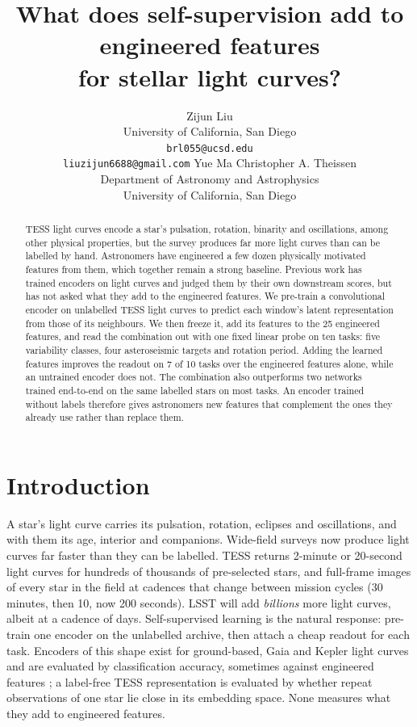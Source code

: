 \documentclass{article}
\title{What does self-supervision add to engineered features\\for stellar light curves?}
\author{%
  Zijun Liu\\
  University of California, San Diego\\
  \texttt{brl055@ucsd.edu}\\
  \texttt{liuzijun6688@gmail.com}
  \And
  Yue Ma
  \And
  Christopher A. Theissen\\
  Department of Astronomy and Astrophysics\\
  University of California, San Diego
}
\begin{document}
\maketitle

\begin{abstract}
TESS light curves encode a star's pulsation, rotation, binarity and oscillations, among other physical
properties, but the survey
produces far more light curves than can be labelled by hand. Astronomers have engineered a few
dozen physically motivated features from them, which together remain a strong baseline. Previous work has trained
encoders on light curves and judged them by their own downstream scores, but has not asked what
they add to the engineered features. We pre-train a convolutional encoder on unlabelled TESS light curves to predict each
window's latent representation from those of its neighbours. We then freeze it, add its features to
the 25 engineered features, and read the combination out with one fixed linear probe on ten tasks:
five variability classes, four asteroseismic targets and rotation period. Adding the learned features
improves the readout on 7 of 10 tasks over the engineered features alone, while an untrained encoder
does not. The combination also outperforms two networks trained end-to-end on the same labelled
stars on most tasks. An encoder trained without labels therefore gives astronomers new features
that complement the ones they already use rather than replace them.
\end{abstract}

\section{Introduction}

A star's light curve carries its pulsation, rotation, eclipses and oscillations, and with them its
age, interior and companions. Wide-field surveys now produce light curves far faster
than they can be labelled. TESS
\citep{ricker2015} returns 2-minute or 20-second \citep{huber2022} light curves for hundreds of
thousands of pre-selected stars, and full-frame images of every star in the field at cadences that
change between mission cycles (30 minutes, then 10, now 200 seconds). LSST \citep{ivezic2019}
will add \emph{billions} more light curves, albeit at a cadence of days. Self-supervised learning is the
natural response: pre-train one encoder on the unlabelled archive, then attach a cheap readout for
each task. Encoders of this shape exist for ground-based, Gaia and Kepler light curves
\citep{donoso2025astromer2,zuo2025falco,rui2026jepa} and are evaluated by classification accuracy,
sometimes against engineered features \citep{rui2026jepa}; a label-free TESS representation
\citep{poznanski2026} is evaluated by whether repeat observations of one star lie close in its embedding space.
None measures what they add to engineered features.
\end{document}

